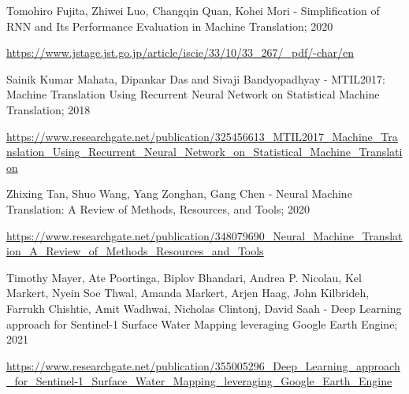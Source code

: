 \begin{thebibliography}{}
		 Tomohiro Fujita, Zhiwei Luo, Changqin Quan, Kohei Mori - Simplification of RNN and Its Performance Evaluation in Machine Translation; 2020
		
		\url{https://www.jstage.jst.go.jp/article/iscie/33/10/33_267/_pdf/-char/en}
		
		 Sainik Kumar Mahata, Dipankar Das and Sivaji Bandyopadhyay -  MTIL2017: Machine Translation Using Recurrent Neural Network on Statistical Machine Translation; 2018
		
		\url{https://www.researchgate.net/publication/325456613_MTIL2017_Machine_Translation_Using_Recurrent_Neural_Network_on_Statistical_Machine_Translation}
		
		 Zhixing Tan, Shuo Wang, Yang Zonghan, Gang Chen - Neural Machine Translation: A Review of Methods, Resources, and Tools; 2020
		
		\url{https://www.researchgate.net/publication/348079690_Neural_Machine_Translation_A_Review_of_Methods_Resources_and_Tools}
		
		 Timothy Mayer, Ate Poortinga, Biplov Bhandari, Andrea P. Nicolau, Kel Markert, Nyein Soe Thwal, Amanda Markert, Arjen Haag, John Kilbrideh, Farrukh Chishtie, Amit Wadhwai, Nicholas Clintonj, David Saah - Deep Learning approach for Sentinel-1 Surface Water Mapping leveraging Google Earth Engine; 2021
		
		\url{https://www.researchgate.net/publication/355005296_Deep_Learning_approach_for_Sentinel-1_Surface_Water_Mapping_leveraging_Google_Earth_Engine}
	\end{thebibliography}




